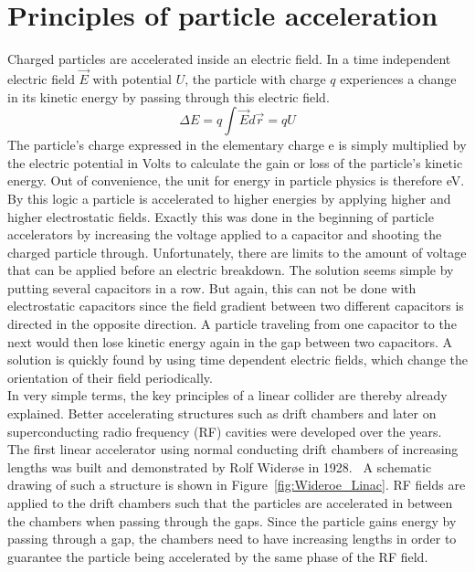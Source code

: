 \section{Principles of particle acceleration}
\label{AccPhysics:Principles}
Charged particles are accelerated inside an electric field. 
In a time independent electric field $\vec{E}$ with potential $U$, the particle with charge $q$ experiences a change in its kinetic energy by passing through this electric field.
\begin{equation}
 \Delta E = q \int \vec{E}d\vec{r} = qU
\end{equation}
The particle's charge expressed in the elementary charge e is simply multiplied by the electric potential in Volts to calculate the gain or loss of the particle's kinetic energy. 
Out of convenience, the unit for energy in particle physics is therefore eV.\\
By this logic a particle is accelerated to higher energies by applying higher and higher electrostatic fields. 
Exactly this was done in the beginning of particle accelerators by increasing the voltage applied to a capacitor and shooting the charged particle through. 
Unfortunately, there are limits to the amount of voltage that can be applied before an electric breakdown.
The solution seems simple by putting several capacitors in a row.
But again, this can not be done with electrostatic capacitors since the field gradient between two different capacitors is directed in the opposite direction.
A particle traveling from one capacitor to the next would then lose kinetic energy again in the gap between two capacitors.
A solution is quickly found by using time dependent electric fields, which change the orientation of their field periodically.\\
In very simple terms, the key principles of a linear collider are thereby already explained.
Better accelerating structures such as drift chambers and later on superconducting radio frequency (RF) cavities were developed over the years.
The first linear accelerator using normal conducting drift chambers of increasing lengths was built and demonstrated by Rolf Wider\o e in 1928.~\cite[p. 6]{Wilson}
A schematic drawing of such a structure is shown in Figure~\ref{fig:Wideroe_Linac}.
RF fields are applied to the drift chambers such that the particles are accelerated in between the chambers when passing through the gaps.
Since the particle gains energy by passing through a gap, the chambers need to have increasing lengths in order to guarantee the particle being accelerated by the same phase of the RF field.
